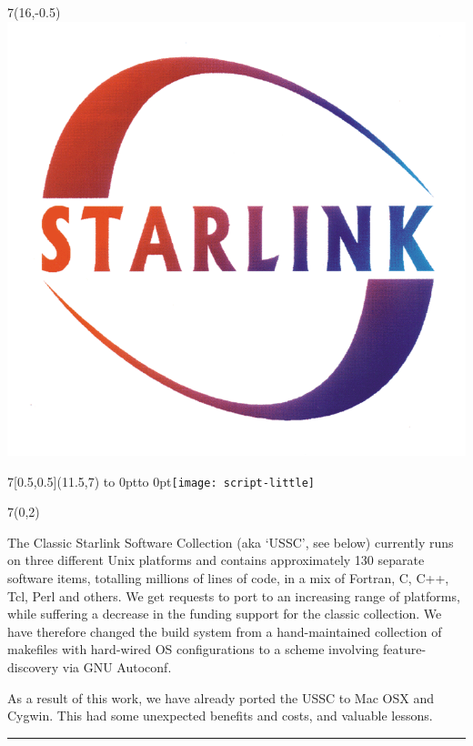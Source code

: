 \documentclass[a0,portrait]{a0poster-ng}
\def\RHead#1{\noindent\hbox to \hsize{\hfil{\LARGE\color{DarkBlue} #1\par}}\bigskip}
\let\Head\RHead
\def\RHead#1{\noindent\hbox to \hsize{\hfil{\huge\color{DarkBlue} #1\par}}\bigskip}
\let\Head\RHead
\begin{document}
\begin{textblock}{7}(16,-0.5)
\includegraphics{starlink_logo}
\end{textblock}

\begin{textblock}{7}[0.5,0.5](11.5,7)
\vbox to 0pt{\vss\hbox to 0pt{\hss\texttt{[image: script-little]}\hss}\vss}%
\end{textblock}



\begin{textblock}{7}(0,2)


\slshape

The Classic Starlink Software Collection (aka `USSC', see below)
currently runs on three different Unix platforms and contains
approximately 130 separate software items, totalling millions of lines
of code, in a mix of Fortran, C, C++, Tcl, Perl and others.  We get requests
to port to an increasing range of platforms, while suffering a
decrease in the funding support for the classic collection.  We have
therefore changed the build system from a hand-maintained collection
of makefiles with hard-wired OS configurations to a scheme involving
feature-discovery via GNU Autoconf.

As a result of this work, we have already ported the USSC to Mac OSX
and Cygwin.  This had some unexpected benefits and costs, and
valuable lessons.

\bigskip
\hrule
\end{textblock}
\end{document}
